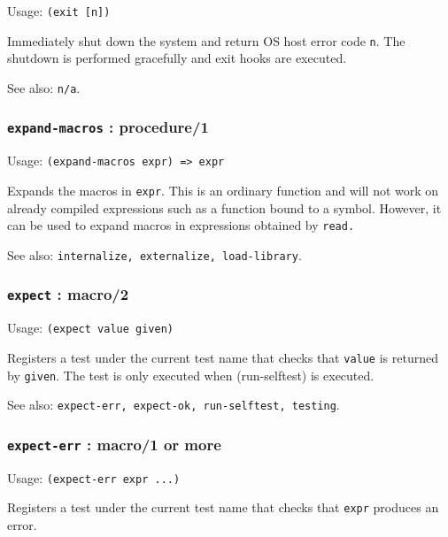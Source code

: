 \documentclass[
]{article}
\newcommand{\passthrough}[1]{#1}
\begin{document}
Usage: \passthrough{\lstinline!(exit [n])!}

Immediately shut down the system and return OS host error code
\passthrough{\lstinline!n!}. The shutdown is performed gracefully and
exit hooks are executed.

See also: \passthrough{\lstinline!n/a!}.

\hypertarget{expand-macros-procedure1}{%
\subsubsection{\texorpdfstring{\texttt{expand-macros} :
procedure/1}{expand-macros : procedure/1}}\label{expand-macros-procedure1}}

Usage: \passthrough{\lstinline!(expand-macros expr) => expr!}

Expands the macros in \passthrough{\lstinline!expr!}. This is an
ordinary function and will not work on already compiled expressions such
as a function bound to a symbol. However, it can be used to expand
macros in expressions obtained by \passthrough{\lstinline!read.!}

See also:
\passthrough{\lstinline!internalize, externalize, load-library!}.

\hypertarget{expect-macro2}{%
\subsubsection{\texorpdfstring{\texttt{expect} :
macro/2}{expect : macro/2}}\label{expect-macro2}}

Usage: \passthrough{\lstinline!(expect value given)!}

Registers a test under the current test name that checks that
\passthrough{\lstinline!value!} is returned by
\passthrough{\lstinline!given!}. The test is only executed when
(run-selftest) is executed.

See also:
\passthrough{\lstinline!expect-err, expect-ok, run-selftest, testing!}.

\hypertarget{expect-err-macro1-or-more}{%
\subsubsection{\texorpdfstring{\texttt{expect-err} : macro/1 or
more}{expect-err : macro/1 or more}}\label{expect-err-macro1-or-more}}

Usage: \passthrough{\lstinline!(expect-err expr ...)!}

Registers a test under the current test name that checks that
\passthrough{\lstinline!expr!} produces an error.
\end{document}
